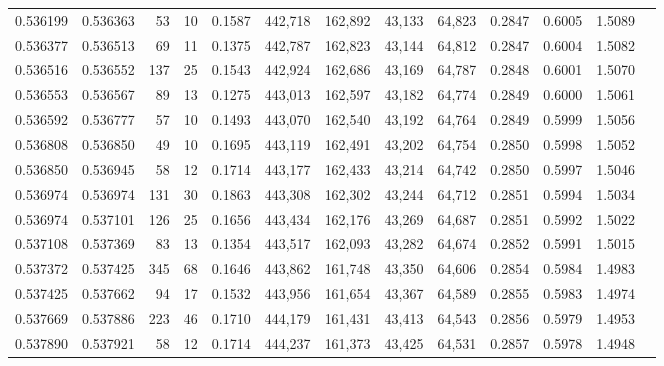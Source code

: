 \begin{tabular}{rrrrrrrrrrrrr}
0.536199 & 0.536363 &    53 &  10 &                                     0.1587 & 442,718 & 162,892 &  43,133 &  64,823 & 0.2847 & 0.6005 & 1.5089 \\
0.536377 & 0.536513 &    69 &  11 &                                     0.1375 & 442,787 & 162,823 &  43,144 &  64,812 & 0.2847 & 0.6004 & 1.5082 \\
0.536516 & 0.536552 &   137 &  25 &                                     0.1543 & 442,924 & 162,686 &  43,169 &  64,787 & 0.2848 & 0.6001 & 1.5070 \\
0.536553 & 0.536567 &    89 &  13 &                                     0.1275 & 443,013 & 162,597 &  43,182 &  64,774 & 0.2849 & 0.6000 & 1.5061 \\
0.536592 & 0.536777 &    57 &  10 &                                     0.1493 & 443,070 & 162,540 &  43,192 &  64,764 & 0.2849 & 0.5999 & 1.5056 \\
0.536808 & 0.536850 &    49 &  10 &                                     0.1695 & 443,119 & 162,491 &  43,202 &  64,754 & 0.2850 & 0.5998 & 1.5052 \\
0.536850 & 0.536945 &    58 &  12 &                                     0.1714 & 443,177 & 162,433 &  43,214 &  64,742 & 0.2850 & 0.5997 & 1.5046 \\
0.536974 & 0.536974 &   131 &  30 &                                     0.1863 & 443,308 & 162,302 &  43,244 &  64,712 & 0.2851 & 0.5994 & 1.5034 \\
0.536974 & 0.537101 &   126 &  25 &                                     0.1656 & 443,434 & 162,176 &  43,269 &  64,687 & 0.2851 & 0.5992 & 1.5022 \\
0.537108 & 0.537369 &    83 &  13 &                                     0.1354 & 443,517 & 162,093 &  43,282 &  64,674 & 0.2852 & 0.5991 & 1.5015 \\
0.537372 & 0.537425 &   345 &  68 &                                     0.1646 & 443,862 & 161,748 &  43,350 &  64,606 & 0.2854 & 0.5984 & 1.4983 \\
0.537425 & 0.537662 &    94 &  17 &                                     0.1532 & 443,956 & 161,654 &  43,367 &  64,589 & 0.2855 & 0.5983 & 1.4974 \\
0.537669 & 0.537886 &   223 &  46 &                                     0.1710 & 444,179 & 161,431 &  43,413 &  64,543 & 0.2856 & 0.5979 & 1.4953 \\
0.537890 & 0.537921 &    58 &  12 &                                     0.1714 & 444,237 & 161,373 &  43,425 &  64,531 & 0.2857 & 0.5978 & 1.4948 \\

\end{tabular}
